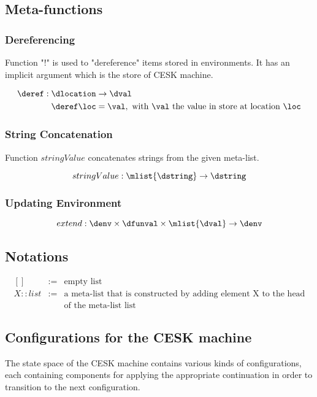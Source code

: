 \documentclass{article}
\begin{document}
\subsection{Meta-functions}
\label{subsec:meta-functions}
\subsubsection{Dereferencing}
\label{subsubsection:dereferecing}
Function "!" is used to "dereference" items stored in environments. It has an implicit argument which is the store of CESK machine.

\begin{align*}
  \deref : \dlocation &\rightarrow \dval \\
  \deref\loc &=  \val, \textrm{ with $\val$ the value in store at location } \loc
\end{align*}

\subsubsection{String Concatenation}
\label{subsubsec:string-concatenation}
Function $stringValue$ concatenates strings from the given meta-list.

\[stringValue : \mlist{\dstring} \rightarrow \dstring\]

\subsubsection{Updating Environment}
\label{subsubsec:updating-env}

\[extend : \denv \times \dfunval \times \mlist{\dval} \rightarrow  \denv \]

\subsection{Notations}
\label{subsec:notations}

\[
  \begin{array}{lcl}
    [] &:=& \textrm{empty list}\\
    X :: list &:=& \textrm{a meta-list that is constructed by adding element X to the head}\\
    && \textrm{of the meta-list list}
  \end{array}
\]
\subsection{Configurations for the CESK machine}
\label{subsec:cesk-configs}
The state space of the CESK machine contains various kinds of configurations, each containing components for applying the appropriate continuation in order to transition to the next configuration. 
\end{document}
